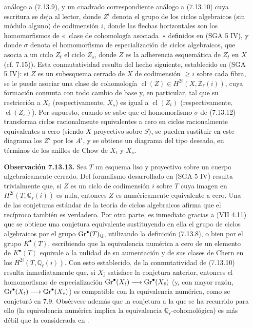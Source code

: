análogo a (7.13.9), y un cuadrado correspondiente análogo a (7.13.10) cuya escritura se deja al lector, donde \(Z^i\) denota el grupo de los ciclos algebraicos (sin módulo alguno) de codimensión \(i\), donde las flechas horizontales son los homomorfismos de «~clase de cohomología asociada~» definidos en (SGA 5 IV), y donde \(\sigma\) denota el homomorfismo de especialización de ciclos algebraicos, que asocia a un ciclo \(Z_t\) el ciclo \(Z_s\), donde \(Z\) es la adherencia esquemática de \(Z_t\) en \(X\) (cf. 7.15)). Esta conmutatividad resulta del hecho siguiente, establecido en (SGA 5 IV): si \(Z\) es un subesquema cerrado de \(X\) de codimensión \(\geq i\) sobre cada fibra, se le puede asociar una clase de cohomología \(\operatorname{cl}(Z)\in H^{2i}(X,\mathbb Z_\ell(i))\), cuya formación conmuta con todo cambio de base y, en particular, tal que su restricción a \(X_t\) (respectivamente, \(X_s\)) es igual a \(\operatorname{cl}(Z_t)\) (respectivamente, \(\operatorname{cl}(Z_s)\)). Por supuesto, cuando se sabe que el homomorfismo \(\sigma\) de (7.13.12) transforma ciclos racionalmente equivalentes a cero en ciclos racionalmente equivalentes a cero (siendo \(X\) proyectivo sobre \(S\)), se pueden sustituir en este diagrama los \(Z^i\) por los \(A^i\), y se obtiene un diagrama del tipo deseado, en términos de los anillos de Chow de \(X_t\) y \(X_s\).

\textbf{Observación 7.13.13.} Sea \(T\) un esquema liso y proyectivo sobre un cuerpo algebraicamente cerrado. Del formalismo desarrollado en (SGA 5 IV) resulta trivialmente que, si \(Z\) es un ciclo de codimensión \(i\) sobre \(T\) cuya imagen en \(H^{2i}(T,\mathbb Q_\ell(i))\) es nula, entonces \(Z\) es numéricamente equivalente a cero. Una de las conjeturas estándar de la teoría de ciclos algebraicos afirma que el recíproco también es verdadero. Por otra parte, es inmediato gracias a (VII 4.11) que se obtiene una conjetura equivalente sustituyendo en ella el grupo de ciclos algebraicos por el grupo \(\operatorname{Gr}^\bullet(T)_{\mathbb Q}\), utilizando la definición (7.13.8), o bien por el grupo \(K^\bullet(T)\), escribiendo que la equivalencia numérica a cero de un elemento de \(K^\bullet(T)\) equivale a la nulidad de su aumentación y de sus clases de Chern en los \(H^{2i}(T,\mathbb Q_\ell(i))\). Con esto establecido, de la conmutatividad de (7.13.10) resulta inmediatamente que, si \(X_{\bar t}\) satisface la conjetura anterior, entonces el homomorfismo de especialización \(\operatorname{Gr}^\bullet(X_{\bar t})\longrightarrow \operatorname{Gr}^\bullet(X_{\bar s})\) (y, con mayor razón, \(\operatorname{Gr}^\bullet(X_t)\longrightarrow \operatorname{Gr}^\bullet(X_s)\)) es compatible con la equivalencia numérica, como se conjeturó en 7.9. Obsérvese además que la conjetura a la que se ha recurrido para ello (la equivalencia numérica implica la equivalencia \(\mathbb Q_\ell\)-cohomológica) es más débil que la considerada en . %

